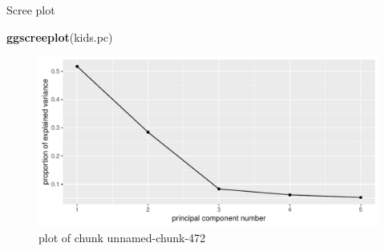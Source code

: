 \documentclass[ignorenonframetext,]{beamer}
\newenvironment{Shaded}{\begin{snugshade}}{\end{snugshade}}
\newcommand{\KeywordTok}[1]{\textcolor[rgb]{0.13,0.29,0.53}{\textbf{#1}}}
\newcommand{\NormalTok}[1]{#1}
\begin{document}
\begin{frame}[fragile]{Scree plot}
\protect\hypertarget{scree-plot-3}{}

\begin{Shaded}
\begin{Highlighting}[]
\KeywordTok{ggscreeplot}\NormalTok{(kids.pc)}
\end{Highlighting}
\end{Shaded}

\begin{figure}
\centering
\includegraphics{figure/unnamed-chunk-472-1.pdf}
\caption{plot of chunk unnamed-chunk-472}
\end{figure}

\end{frame}
\end{document}
